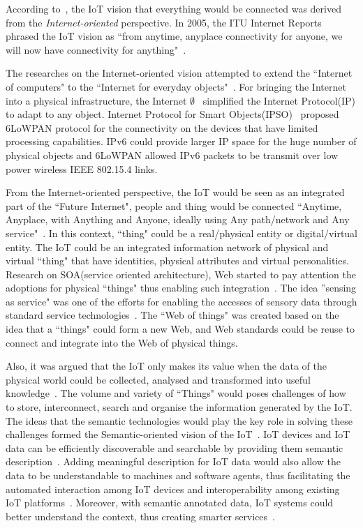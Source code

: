 According to~\cite{Atzori:2010}, the IoT vision that everything would be connected was derived from the \textit{Internet-oriented} perspective.
In 2005, the ITU Internet Reports phrased the IoT vision as ``from anytime, anyplace connectivity for anyone, we will now have connectivity for anything"~\citep{ITU:2005}.

The researches on the Internet-oriented vision attempted to extend the ``Internet of computers" to the ``Internet for everyday objects"~\citep{Mattern:2010}.
For bringing the Internet into a physical infrastructure, the Internet $\emptyset$~\citep{Gershenfeld:2006} simplified the Internet Protocol(IP) to adapt to any object.
Internet Protocol for Smart Objects(IPSO)~\citep{Dunkels:2008} proposed 6LoWPAN protocol for the connectivity on the devices that have limited processing capabilities.
IPv6 could provide larger IP space for the huge number of physical objects and 6LoWPAN allowed IPv6 packets to be transmit over low power wireless IEEE 802.15.4 links.

From the Internet-oriented perspective, the IoT would be seen as an integrated part of the ``Future Internet", people and thing would be connected ``Anytime, Anyplace, with Anything and Anyone, ideally using Any path/network and Any service"~\citep{Sundmaeker:2010}.
In this context, ``thing" could be a real/physical entity or digital/virtual entity.
The IoT could be an integrated information network of physical and virtual ``thing" that have identities, physical attributes and virtual personalities.  
Research on SOA(service oriented architecture), Web started to pay attention the adoptions for physical ``things" thus enabling such integration~\citep{De:2011, De:2012,Guinard:2009}. 
The idea ''sensing as service" was one of the efforts for enabling the accesses of sensory data through standard service technologies~\citep{Perera:2014a}. 
The ``Web of things" was created based on the idea that a ``things" could form a new Web, and Web standards could be reuse to connect and integrate into the Web of physical things.

Also, it was argued that the IoT only makes its value when the data of the physical world could be collected, analysed and transformed into useful knowledge~\citep{Vermesan:2011}.
The volume and variety of ``Things" would poses challenges of how to store, interconnect, search and organise the information generated by the IoT. 
The ideas that the semantic technologies would play the key role in solving these challenges formed the Semantic-oriented vision of the IoT~\citep{Atzori:2014,Barnaghi:2012}.
IoT devices and IoT data can be efficiently discoverable and searchable by providing them semantic description~\citep{Ioan:2009, Chun:2015,Serena:2017}. 
Adding meaningful description for IoT data would also allow the data to be understandable to machines and software agents, thus facilitating the automated interaction among IoT devices and interoperability among existing IoT platforms~\citep{IERC:2015, Ganzha:2017}. 
Moreover, with semantic annotated data, IoT systems could better understand the context, thus creating smarter services~\citep{Perera:2014a}. 

